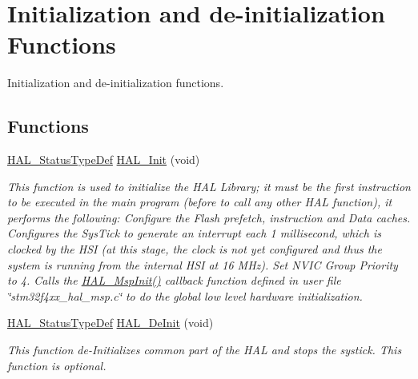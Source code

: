 \hypertarget{group___h_a_l___exported___functions___group1}{}\section{Initialization and de-\/initialization Functions}
\label{group___h_a_l___exported___functions___group1}


Initialization and de-\/initialization functions.  


\subsection*{Functions}
\begin{DoxyCompactItemize}
\item 
\mbox{\hyperlink{stm32f4xx__hal__def_8h_a63c0679d1cb8b8c684fbb0632743478f}{H\+A\+L\+\_\+\+Status\+Type\+Def}} \mbox{\hyperlink{group___h_a_l___exported___functions___group1_gaecac54d350c3730e6831eb404e557dc4}{H\+A\+L\+\_\+\+Init}} (void)
\begin{DoxyCompactList}\small\item\em This function is used to initialize the H\+AL Library; it must be the first instruction to be executed in the main program (before to call any other H\+AL function), it performs the following\+: Configure the Flash prefetch, instruction and Data caches. Configures the Sys\+Tick to generate an interrupt each 1 millisecond, which is clocked by the H\+SI (at this stage, the clock is not yet configured and thus the system is running from the internal H\+SI at 16 M\+Hz). Set N\+V\+IC Group Priority to 4. Calls the \mbox{\hyperlink{group___h_a_l___exported___functions___group1_ga07e099a69ab23e79be8b7a80505de519}{H\+A\+L\+\_\+\+Msp\+Init()}} callback function defined in user file \char`\"{}stm32f4xx\+\_\+hal\+\_\+msp.\+c\char`\"{} to do the global low level hardware initialization. \end{DoxyCompactList}\item 
\mbox{\hyperlink{stm32f4xx__hal__def_8h_a63c0679d1cb8b8c684fbb0632743478f}{H\+A\+L\+\_\+\+Status\+Type\+Def}} \mbox{\hyperlink{group___h_a_l___exported___functions___group1_ga95911129a26afb05232caaaefa31956f}{H\+A\+L\+\_\+\+De\+Init}} (void)
\begin{DoxyCompactList}\small\item\em This function de-\/\+Initializes common part of the H\+AL and stops the systick. This function is optional. ~\newline

\end{DoxyCompactList}
\end{DoxyCompactItemize}

